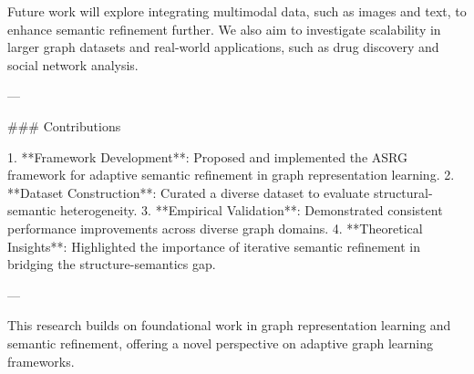 Future work will explore integrating multimodal data, such as images and text, to enhance semantic refinement further. We also aim to investigate scalability in larger graph datasets and real-world applications, such as drug discovery and social network analysis.  

---

### Contributions  

1. **Framework Development**: Proposed and implemented the ASRG framework for adaptive semantic refinement in graph representation learning.  
2. **Dataset Construction**: Curated a diverse dataset to evaluate structural-semantic heterogeneity.  
3. **Empirical Validation**: Demonstrated consistent performance improvements across diverse graph domains.  
4. **Theoretical Insights**: Highlighted the importance of iterative semantic refinement in bridging the structure-semantics gap.  

--- 

This research builds on foundational work in graph representation learning and semantic refinement, offering a novel perspective on adaptive graph learning frameworks.